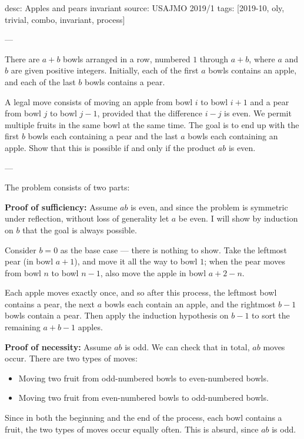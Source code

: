 desc: Apples and pears invariant
source: USAJMO 2019/1
tags: [2019-10, oly, trivial, combo, invariant, process]

---

There are $a+b$ bowls arranged in a row, numbered $1$ through $a+b$, where $a$ and $b$ are given positive integers. Initially, each of the first $a$ bowls contains an apple, and each of the last $b$ bowls contains a pear.

A legal move consists of moving an apple from bowl $i$ to bowl $i+1$ and a pear from bowl $j$ to bowl $j-1$, provided that the difference $i-j$ is even. We permit multiple fruits in the same bowl at the same time. The goal is to end up with the first $b$ bowls each containing a pear and the last $a$ bowls each containing an apple. Show that this is possible if and only if the product $ab$ is even.


---

The problem consists of two parts:

\bigskip

\textbf{Proof of sufficiency:} Assume $ab$ is even, and since the problem is symmetric under reflection, without loss of generality let $a$ be even. I will show by induction on $b$ that the goal is always possible.

Consider $b=0$ as the base case --- there is nothing to show. Take the leftmost pear (in bowl $a+1$), and move it all the way to bowl $1$; when the pear moves from bowl $n$ to bowl $n-1$, also move the apple in bowl $a+2-n$.

Each apple moves exactly once, and so after this process, the leftmost bowl contains a pear, the next $a$ bowls each contain an apple, and the rightmost $b-1$ bowls contain a pear. Then apply the induction hypothesis on $b-1$ to sort the remaining $a+b-1$ apples.

\bigskip

\textbf{Proof of necessity:} Assume $ab$ is odd. We can check that in total, $ab$ moves occur. There are two types of moves:
\begin{itemize}[itemsep=0em]
    \item Moving two fruit from odd-numbered bowls to even-numbered bowls.
    \item Moving two fruit from even-numbered bowls to odd-numbered bowls.
\end{itemize}
Since in both the beginning and the end of the process, each bowl contains a fruit, the two types of moves occur equally often. This is absurd, since $ab$ is odd.


